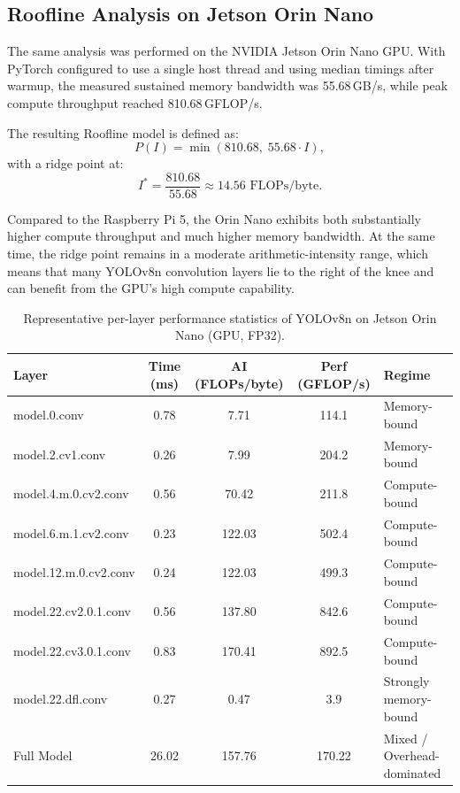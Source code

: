 \documentclass[12pt,a4paper]{report}
\begin{document}
\subsection{Roofline Analysis on Jetson Orin Nano}

The same analysis was performed on the NVIDIA Jetson Orin Nano GPU.
With PyTorch configured to use a single host thread and using median timings
after warmup, the measured sustained memory bandwidth was 55.68\,GB/s,
while peak compute throughput reached 810.68\,GFLOP/s.

\noindent The resulting Roofline model is defined as:
\[
P(I) = \min\left(810.68,\; 55.68 \cdot I\right),
\]
with a ridge point at:
\[
I^* = \frac{810.68}{55.68} \approx 14.56 \text{ FLOPs/byte}.
\]

Compared to the Raspberry Pi 5, the Orin Nano exhibits both substantially
higher compute throughput and much higher memory bandwidth. At the same time,
the ridge point remains in a moderate arithmetic-intensity range, which means
that many YOLOv8n convolution layers lie to the right of the knee and can
benefit from the GPU's high compute capability.

\begin{table}[ht]
\centering
\caption{Representative per-layer performance statistics of YOLOv8n on Jetson Orin Nano (GPU, FP32).}
\label{tab:roofline_orin_layers}

\begin{tabularx}{\textwidth}{l c c c X}
\toprule
Layer & Time (ms) & AI (FLOPs/byte) & Perf (GFLOP/s) & Regime \\
\midrule
model.0.conv              & 0.78 & 7.71   & 114.1 & Memory-bound \\
model.2.cv1.conv          & 0.26 & 7.99   & 204.2 & Memory-bound \\
model.4.m.0.cv2.conv      & 0.56 & 70.42  & 211.8 & Compute-bound \\
model.6.m.1.cv2.conv      & 0.23 & 122.03 & 502.4 & Compute-bound \\
model.12.m.0.cv2.conv     & 0.24 & 122.03 & 499.3 & Compute-bound \\
model.22.cv2.0.1.conv     & 0.56 & 137.80 & 842.6 & Compute-bound \\
model.22.cv3.0.1.conv     & 0.83 & 170.41 & 892.5 & Compute-bound \\
model.22.dfl.conv         & 0.27 & 0.47   & 3.9   & Strongly memory-bound \\
\midrule
Full Model                & 26.02 & 157.76 & 170.22 & Mixed / Overhead-dominated \\
\bottomrule
\end{tabularx}

\end{table}
\end{document}
